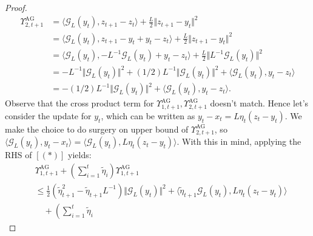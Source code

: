 \documentclass[12pt]{article}
\begin{document}
\begin{proof}
            \begin{align*}
                \Upsilon_{2, t + 1}^{\text{AG}} 
                &= 
                \langle \mathcal G_L(y_t), z_{t + 1} - z_t\rangle + 
                \frac{L}{2}\Vert z_{t + 1} - y_t\Vert^2
                \\
                &= 
                \langle \mathcal G_L(y_t), z_{t + 1} - y_t + y_t - z_t\rangle
                + \frac{L}{2}\Vert z_{t + 1} - y_t\Vert^2
                \\
                &= 
                \langle \mathcal G_L(y_t), - L^{-1} \mathcal G_L(y_t) + y_t - z_t\rangle
                + 
                \frac{L}{2}\Vert L^{-1}\mathcal G_L(y_t)\Vert^2
                \\
                &= 
                -L^{-1}\Vert \mathcal G_L(y_t)\Vert^2 
                + 
                (1/2)L^{-1}\Vert \mathcal G_L(y_t)\Vert^2 
                + 
                \langle \mathcal G_L(y_t), y_t - z_t\rangle
                \\
                &= 
                -(1/2)L^{-1}\Vert \mathcal G_L(y_t)\Vert^2
                + 
                \langle \mathcal G_L(y_t), y_t - z_t\rangle. 
            \end{align*}
            Observe that the cross product term for $\Upsilon_{1, t + 1}^\text{AG}, \Upsilon_{2, t + 1}^\text{AG}$ doesn't match. 
            Hence let's consider the update for $y_t$, which can be written as $y_t - x_t = L \eta_t (z_t - y_t)$. We make the choice to do surgery on upper bound of $\Upsilon_{2, t + 1}^\text{AG}$, so $\langle \mathcal G_L(y_t), y_t - x_t\rangle = \langle \mathcal G_L(y_t), L \eta_t (z_t - y_t)\rangle$. 
            With this in mind, applying the RHS of $[(*)]$ yields: 
            {\footnotesize
            \begin{align*}
                &\Upsilon_{1, t + 1}^\text{AG} + 
                \left(
                    \sum_{i = 1}^{t}\tilde\eta_i 
                \right)\Upsilon_{1, t + 1}^{\text{AG}}
                \\
                &\le 
                \frac{1}{2}\left(
                    \tilde\eta_{t + 1}^2 - \tilde\eta_{t + 1}L^{-1}
                \right)\Vert \mathcal G_L(y_t)\Vert^2 
                + 
                \langle \tilde\eta_{t + 1} \mathcal G_L(y_t), L\eta_t(z_t - y_t)\rangle
                \\
                &\quad 
                + 
                \left(
                    \sum_{i = 1}^{t}\tilde\eta_i 

\end{align*}}
\end{proof}
\end{document}
